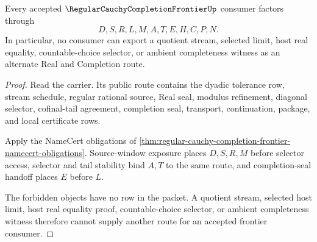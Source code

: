 \begin{theorem}
\label{thm:regular-cauchy-completion-frontier-nonescape}
Every accepted $\RegularCauchyCompletionFrontierUp$ consumer factors through
$$
D,S,R,L,M,A,T,E,H,C,P,N.
$$
In particular, no consumer can export a quotient stream, selected limit, host real equality, countable-choice selector, or ambient completeness witness as an alternate Real and Completion route.
\end{theorem}
\begin{proof}
Read the carrier. Its public route contains the dyadic tolerance row, stream schedule, regular rational source, Real seal, modulus refinement, diagonal selector, cofinal-tail agreement, completion seal, transport, continuation, package, and local certificate rows.

Apply the NameCert obligations of \autoref{thm:regular-cauchy-completion-frontier-namecert-obligations}. Source-window exposure places $D,S,R,M$ before selector access, selector and tail stability bind $A,T$ to the same route, and completion-seal handoff places $E$ before $L$.

The forbidden objects have no row in the packet. A quotient stream, selected host limit, host real equality proof, countable-choice selector, or ambient completeness witness therefore cannot supply another route for an accepted frontier consumer.
\end{proof}

